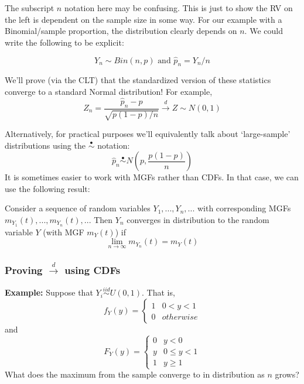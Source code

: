 \documentclass[
]{article}
\providecommand{\tightlist}{%
  \setlength{\itemsep}{0pt}\setlength{\parskip}{0pt}}
\begin{document}
The subscript \(n\) notation here may be confusing. This is just to show
the RV on the left is dependent on the sample size in some way. For our
example with a Binomial/sample proportion, the distribution clearly
depends on \(n\). We could write the following to be explicit:

\[Y_n \sim Bin(n, p)\mbox{   and   } \hat{p}_n = Y_n/n\]

We'll prove (via the CLT) that the standardized version of these
statistics converge to a standard Normal distribution! For example,
\[Z_n = \frac{\hat{p}_n-p}{\sqrt{p(1-p)/n}} \stackrel{d}{\rightarrow}Z\sim N(0,1)\]

Alternatively, for practical purposes we'll equivalently talk about
`large-sample' distributions using the \(\stackrel{\bullet}{\sim}\)
notation:
\[\hat{p}_n\stackrel{\bullet}{\sim}N\left(p, \frac{p(1-p)}{n}\right)\]
It is sometimes easier to work with MGFs rather than CDFs. In that case,
we can use the following result:

\begin{description}
\tightlist
\item[Convergence of MGFs]
Consider a sequence of random variables \(Y_1,...,Y_n,...\) with
corresponding MGFs \(m_{Y_1}(t), ..., m_{Y_n}(t),..\). Then \(Y_n\)
converges in distribution to the random variable \(Y\) (with MGF
\(m_Y(t)\)) if \[\lim_{n \rightarrow \infty} m_{Y_n}(t) = m_Y(t)\]
\end{description}

\hypertarget{proving-stackreldrightarrow-using-cdfs}{%
\subsubsection{\texorpdfstring{Proving \(\stackrel{d}\rightarrow\) using
CDFs}{Proving \textbackslash stackrel\{d\}\textbackslash rightarrow using CDFs}}\label{proving-stackreldrightarrow-using-cdfs}}

\textbf{Example:} Suppose that \(Y_i\stackrel{iid}\sim U(0,1)\). That
is, \[f_Y(y) = \begin{cases}1 & 0<y<1\\0 & otherwise\end{cases}\] and
\[F_Y(y) = \begin{cases} 0 & y < 0\\ y & 0\leq y < 1 \\ 1 & y\geq 1\end{cases}\]
What does the maximum from the sample converge to in distribution as
\(n\) grows?
\end{document}
